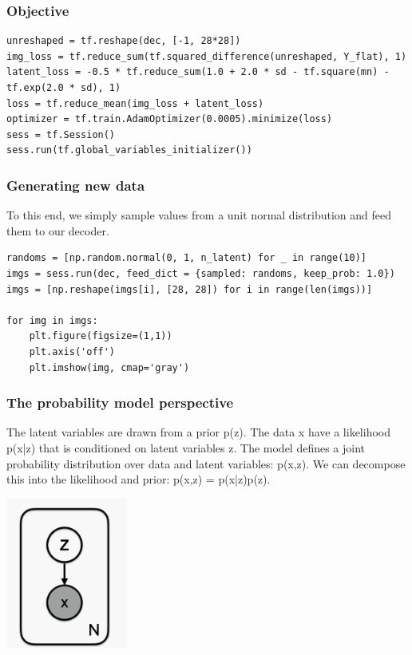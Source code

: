 \documentclass[a4paper]{article}
\begin{document}
\subsubsection{Objective}
\begin{verbatim}
unreshaped = tf.reshape(dec, [-1, 28*28])
img_loss = tf.reduce_sum(tf.squared_difference(unreshaped, Y_flat), 1)
latent_loss = -0.5 * tf.reduce_sum(1.0 + 2.0 * sd - tf.square(mn) - tf.exp(2.0 * sd), 1)
loss = tf.reduce_mean(img_loss + latent_loss)
optimizer = tf.train.AdamOptimizer(0.0005).minimize(loss)
sess = tf.Session()
sess.run(tf.global_variables_initializer())
\end{verbatim}

\subsubsection{Generating new data}
To this end, we simply sample values from a unit normal distribution and feed them to our decoder.
\begin{verbatim}
randoms = [np.random.normal(0, 1, n_latent) for _ in range(10)]
imgs = sess.run(dec, feed_dict = {sampled: randoms, keep_prob: 1.0})
imgs = [np.reshape(imgs[i], [28, 28]) for i in range(len(imgs))]

for img in imgs:
    plt.figure(figsize=(1,1))
    plt.axis('off')
    plt.imshow(img, cmap='gray')
\end{verbatim}

\subsubsection{The probability model perspective}
The latent variables are drawn from a prior p(z). The data x have a likelihood p(x|z) that is conditioned on latent variables z. The model defines a joint probability distribution over data and latent variables: p(x,z). We can decompose this into the likelihood and prior: p(x,z) = p(x|z)p(z).

\begin{center}
\includegraphics[width=4cm, height=5cm]{vae.png}
\end{center}
\end{document}
